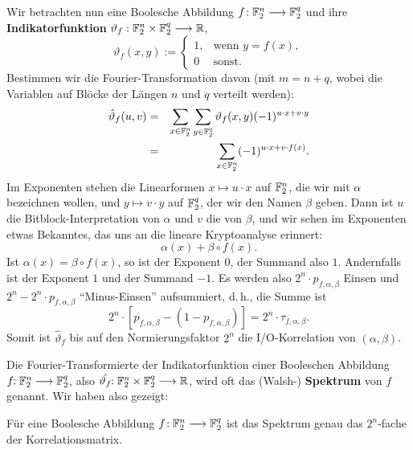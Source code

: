\begin{refsegment}
Wir betrachten nun eine Boolesche
Abbildung
$f\!: \mathbb{F}_2^n \longrightarrow \mathbb{F}_2^q$ und ihre
{\bf Indikatorfunktion}
$\vartheta_f: \mathbb{F}_2^n \times \mathbb{F}_2^q \longrightarrow \mathbb{R}$,
\[
  \vartheta_f(x,y) := \left\{ \begin{array}{ll}
                     1, & \textrm{wenn } y = f(x), \\
                     0  & \textrm{sonst.}
                   \end{array} \right.
\]
Bestimmen wir die Fourier-Transformation
davon (mit $m = n+q$, wobei die
Variablen auf Blöcke der Längen $n$ und $q$ verteilt werden):
\begin{eqnarray*}
  \hat{\vartheta}_f(u,v) & = & \sum_{x \in \mathbb{F}_2^n} \sum_{y \in \mathbb{F}_2^q}
                            \vartheta_f(x,y) (-1)^{u\cdot x + v\cdot y} \\
    & = & \sum_{x \in \mathbb{F}_2^n} (-1)^{u\cdot x + v\cdot f(x)}.
\end{eqnarray*}
Im Exponenten stehen die Linearformen $x \mapsto u \cdot x$ auf $\mathbb{F}_2^n$,
die wir mit $\alpha$ bezeichnen wollen, und $y \mapsto v \cdot y$ auf $\mathbb{F}_2^q$,
der wir den Namen $\beta$ geben. Dann ist $u$ die Bitblock-Interpretation
von $\alpha$ und $v$ die von $\beta$, und wir sehen im Exponenten etwas Bekanntes,
das uns an die lineare
Kryptoanalyse erinnert:
\[
     \alpha(x) + \beta \circ f(x).
\]
Ist $\alpha(x) = \beta \circ f(x)$, so ist der Exponent $0$, der
Summand also $1$. Andernfalls ist der Exponent $1$ und der Summand $-1$.
Es werden also $2^n \cdot p_{f,\alpha,\beta}$ Einsen und
$2^n - 2^n \cdot p_{f,\alpha,\beta}$ "`Minus-Einsen"' aufsummiert, d.\,h.,
die Summe ist
\[
     2^n \cdot [p_{f,\alpha,\beta} - (1 - p_{f,\alpha,\beta})]
     = 2^n \cdot \tau_{f,\alpha,\beta}.
\]
Somit ist $\hat{\vartheta}_f$ bis auf den Normierungsfaktor $2^n$ die
I/O-Korrelation von $(\alpha, \beta)$.

Die Fourier-Transformierte der Indikatorfunktion
einer Booleschen Abbildung
$f\!\!: \mathbb{F}_2^n \longrightarrow \mathbb{F}_2^q$, also
$\hat{\vartheta_f}\!\!: \mathbb{F}_2^n \times \mathbb{F}_2^q \longrightarrow \mathbb{R}$,
wird oft das (Walsh-) {\bf Spektrum}
von $f$ genannt. Wir haben also gezeigt:

\begin{satz}\label{hwtchar}
  Für eine Boolesche Abbildung $f\!:\mathbb{F}_2^n \longrightarrow \mathbb{F}_2^q$
  ist das Spektrum genau das $2^n$-fache der
  Korrelationsmatrix.
\end{satz}


\end{refsegment}
